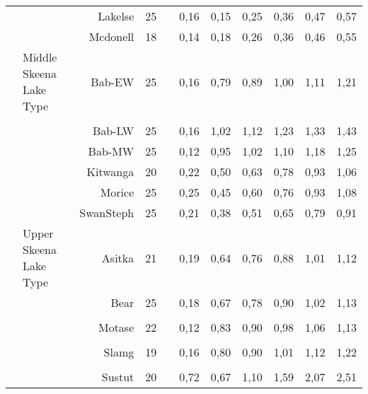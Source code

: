 \documentclass[french,11pt]{book}
\begin{document}
\begin{longtable}[t]{llrr>{}rrrrllr}
\cmidrule(l){3-11}  &  & Lakelse & 25 & \cellcolor{cyan}{*0,36} & 0,16 & 0,15 & 0,25 & 0,36 & 0,47 & 0,57\\
\cmidrule(l){3-11}  &  & Mcdonell & 18 & \cellcolor{cyan}{*0,36} & 0,14 & 0,18 & 0,26 & 0,36 & 0,46 & 0,55\\
\cmidrule(l){2-11}  & Middle Skeena Lake Type & Bab-EW & 25 & \cellcolor{white}{1,00} & 0,16 & 0,79 & 0,89 & 1,00 & 1,11 & 1,21\\
\cmidrule(l){3-11}\\  &  & Bab-LW & 25 & \cellcolor{orange}{*1,23} & 0,16 & 1,02 & 1,12 & 1,23 & 1,33 & 1,43\\
\cmidrule(l){3-11}  &  & Bab-MW & 25 & \cellcolor{orange}{*1,10} & 0,12 & 0,95 & 1,02 & 1,10 & 1,18 & 1,25\\
\cmidrule(l){3-11}  &  & Kitwanga & 20 & \cellcolor{cyan}{*0,78} & 0,22 & 0,50 & 0,63 & 0,78 & 0,93 & 1,06\\
\cmidrule(l){3-11}  &  & Morice & 25 & \cellcolor{cyan}{*0,76} & 0,25 & 0,45 & 0,60 & 0,76 & 0,93 & 1,08\\
\cmidrule(l){3-11}  &  & SwanSteph & 25 & \cellcolor{cyan}{*0,65} & 0,21 & 0,38 & 0,51 & 0,65 & 0,79 & 0,91\\
\cmidrule(l){2-11}  & Upper Skeena Lake Type & Asitka & 21 & \cellcolor{cyan}{*0,88} & 0,19 & 0,64 & 0,76 & 0,88 & 1,01 & 1,12\\
\cmidrule(l){3-11}  &  & Bear & 25 & \cellcolor{white}{0,90} & 0,18 & 0,67 & 0,78 & 0,90 & 1,02 & 1,13\\
\cmidrule(l){3-11}\\  &  & Motase & 22 & \cellcolor{white}{0,98} & 0,12 & 0,83 & 0,90 & 0,98 & 1,06 & 1,13\\
\cmidrule(l){3-11}\\  &  & Slamg & 19 & \cellcolor{white}{1,01} & 0,16 & 0,80 & 0,90 & 1,01 & 1,12 & 1,22\\
\cmidrule(l){3-11}\\  &  & Sustut & 20 & \cellcolor{orange}{*1,59} & 0,72 & 0,67 & 1,10 & 1,59 & 2,07 & 2,51\\* \end{longtable}

\endgroup{} \endgroup{}

\clearpage
\end{document}
